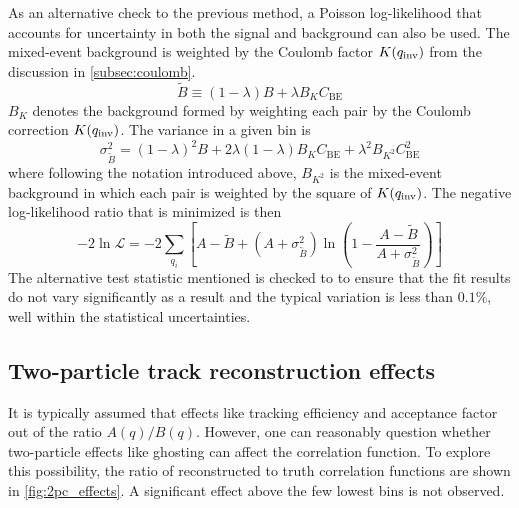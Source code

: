 As an alternative check to the previous method, a Poisson log-likelihood that accounts for uncertainty in both the signal and background can also be used.
The mixed-event background is weighted by the Coulomb factor $K(q_{\mathrm{inv}})$ from the discussion in \cref{subsec:coulomb}.
\begin{equation}
  \tilde{B} \equiv (1-\lambda)B + \lambda B_{K} C_{\textrm{BE}}
\end{equation}
$B_{K}$ denotes the background formed by weighting each pair by the Coulomb correction $K(q_{\mathrm{inv}})$.
The variance in a given bin is
\begin{equation}
  \sigma_{\tilde{B}}^2 = (1-\lambda)^2 B + 2\lambda(1-\lambda)B_{K} C_{\textrm{BE}} + \lambda^2 B_{K^2} C_{\textrm{BE}}^2
\end{equation}
where following the notation introduced above, $B_{K^2}$ is the mixed-event background in which each pair is weighted by the square of $K(q_{\mathrm{inv}})$.
The negative log-likelihood ratio that is minimized is then \cite{Soltz:1994PhDT} %
\begin{equation}
  - 2\ln \mathcal{L} = -2 \sum_{q_i} \left[ A - \tilde{B} + \left( A + \sigma_{\tilde{B}}^2 \right) \ln \left(1 - \frac{A - \tilde{B}}{A + \sigma_{\tilde{B}}^2} \right) \right]
\end{equation}
The alternative test statistic mentioned is checked to to ensure that the fit results do not vary significantly as a result and the typical variation is less than $0.1\%$, well within the statistical uncertainties.


\subsection{Two-particle track reconstruction effects}
It is typically assumed that effects like tracking efficiency and acceptance factor out of the ratio $A(q) / B(q)$.
However, one can reasonably question whether two-particle effects like ghosting can affect the correlation function.
To explore this possibility, the ratio of reconstructed to truth correlation functions are shown in \cref{fig:2pc_effects}.
A significant effect above the few lowest \qinv bins is not observed.

